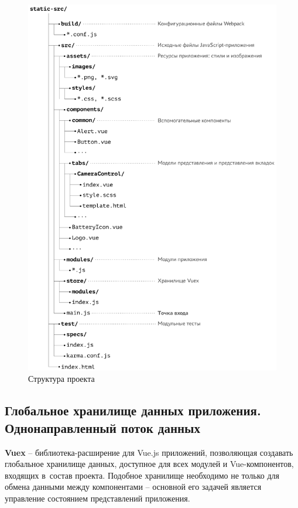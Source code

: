 \begin{figure}[h!]
  \centering
  \setlength{\fboxsep}{5pt}
  \includegraphics[width=.95\textwidth]{img/tikz/project-tree/pic}
  \vspace*{6pt}
  \caption{Структура проекта}\label{fig:project-tree}
\end{figure}



\subsection{Глобальное хранилище данных приложения. Однонаправленный поток данных}

\textbf{Vuex} -- библиотека-расширение для Vue.js приложений, позволяющая создавать глобальное хранилище данных, доступное для всех модулей и Vue-компонентов, входящих в~состав проекта. Подобное хранилище необходимо не только для обмена данными между компонентами -- основной его задачей является управление состоянием представлений приложения.

